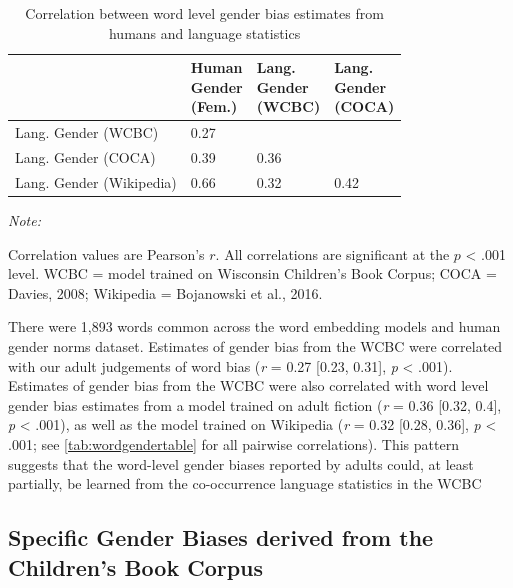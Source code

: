 \documentclass[english,,man,floatsintext]{apa6}
\begin{document}
\begin{table}

\caption{\label{tab:wordgendertable}Correlation between word level gender bias estimates from humans and language statistics}
\centering
\fontsize{7}{9}\selectfont
\begin{threeparttable}
\begin{tabular}[t]{llll}
\toprule
 & \makecell[l]{Human\\Gender\\(Fem.)} & \makecell[l]{Lang.\\Gender\\(WCBC)} & \makecell[l]{Lang.\\Gender\\(COCA)}\\
\midrule
Lang. Gender (WCBC) & 0.27 &  & \\
Lang. Gender (COCA) & 0.39 & 0.36 & \\
Lang. Gender (Wikipedia) & 0.66 & 0.32 & 0.42\\
\bottomrule
\end{tabular}
\begin{tablenotes}[para]
\item \textit{Note:} 
\item Correlation values are Pearson's $r$. All correlations are significant at the $p$ < .001 level. WCBC = model trained on Wisconsin Children’s Book Corpus; COCA = Davies, 2008; Wikipedia = Bojanowski et al., 2016.
\end{tablenotes}
\end{threeparttable}
\end{table}

There were 1,893 words common across the word embedding models and human gender norms dataset. Estimates of gender bias from the WCBC were correlated with our adult judgements of word bias (\emph{r} = 0.27 {[}0.23, 0.31{]}, \emph{p} \textless{} .001). Estimates of gender bias from the WCBC were also correlated with word level gender bias estimates from a model trained on adult fiction (\emph{r} = 0.36 {[}0.32, 0.4{]}, \emph{p} \textless{} .001), as well as the model trained on Wikipedia (\emph{r} = 0.32 {[}0.28, 0.36{]}, \emph{p} \textless{} .001; see \autoref{tab:wordgendertable} for all pairwise correlations). This pattern suggests that the word-level gender biases reported by adults could, at least partially, be learned from the co-occurrence language statistics in the WCBC

\hypertarget{specific-gender-biases-derived-from-the-childrens-book-corpus}{%
\subsection{Specific Gender Biases derived from the Children's Book Corpus}\label{specific-gender-biases-derived-from-the-childrens-book-corpus}}
\end{document}
